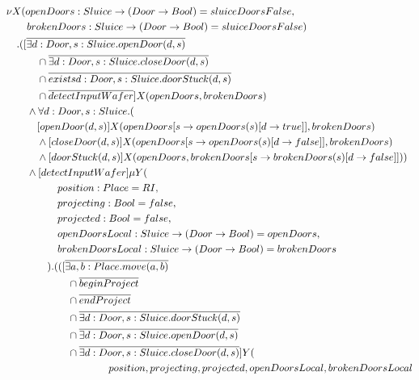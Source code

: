 \begin{description}
\begin{align*}\allowdisplaybreaks
& \nu X(openDoors: Sluice \to (Door \to Bool) = sluiceDoorsFalse, \\
& \tab\tab brokenDoors: Sluice \to (Door \to Bool) = sluiceDoorsFalse) \\
& \tab . ([\overline{\exists d: Door, s: Sluice . openDoor(d, s)} \\
& \tab\tab\tab \cap \overline{\exists d: Door, s: Sluice . closeDoor(d, s)} \\
& \tab\tab\tab \cap \overline{exists d: Door, s: Sluice . doorStuck(d, s)} \\
& \tab\tab\tab \cap \overline{detectInputWafer}]X(openDoors, brokenDoors) \\
& \tab\tab \wedge \forall d: Door, s: Sluice . ( \\
& \tab\tab\tab [openDoor(d, s)]X(openDoors[s \to openDoors(s)[d \to true]], brokenDoors) \\
& \tab\tab\tab \wedge [closeDoor(d, s)]X(openDoors[s \to openDoors(s)[d \to false]], brokenDoors) \\
& \tab\tab\tab \wedge [doorStuck(d, s)]X(openDoors, brokenDoors[s \to brokenDoors(s)[d \to false]])) \\
& \tab\tab \wedge [detectInputWafer]\mu Y( \\ 
& \tab\tab\tab\tab\tab position: Place = RI, \\
& \tab\tab\tab\tab\tab projecting: Bool = false, \\
& \tab\tab\tab\tab\tab projected: Bool = false, \\
& \tab\tab\tab\tab\tab openDoorsLocal: Sluice \to (Door \to Bool) = openDoors, \\
& \tab\tab\tab\tab\tab brokenDoorsLocal: Sluice \to (Door \to Bool) = brokenDoors \\
& \tab\tab\tab\tab ) . (([\overline{\exists a, b: Place . move(a, b)} \\
& \tab\tab\tab\tab\tab\tab \cap \overline{beginProject} \\
& \tab\tab\tab\tab\tab\tab \cap \overline{endProject} \\
& \tab\tab\tab\tab\tab\tab \cap \overline{\exists d: Door, s: Sluice . doorStuck(d, s)} \\
& \tab\tab\tab\tab\tab\tab \cap \overline{\exists d: Door, s: Sluice . openDoor(d, s)} \\
& \tab\tab\tab\tab\tab\tab \cap \overline{\exists d: Door, s: Sluice . closeDoor(d, s)}]Y( \\
& \tab\tab\tab\tab\tab\tab\tab\tab\tab\tab position, projecting, projected, openDoorsLocal, brokenDoorsLocal \\

\end{align*}
\end{description}
